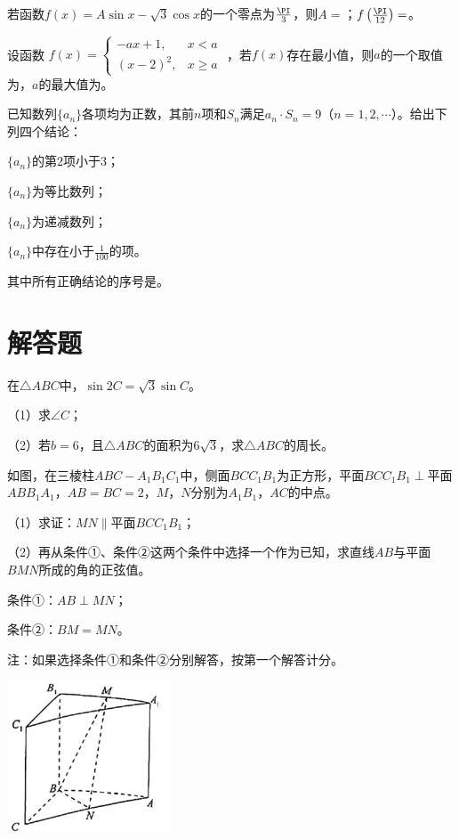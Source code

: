\documentclass[fontset=founder]{ucedubook}
\let\pi=\PI
\begin{document}
\begin{ti}[.2]
  若函数$f(x)=A\sin x-\sqrt{3}\cos x$的一个零点为$\frac{\pi}{3}$，则$A=$\kong{}；$f\left(\frac{\pi}{12}\right)=$\kong{}。
\end{ti}


\begin{ti}[.2]
  设函数 $f(x)=\begin{cases}
    -ax+1, & x<a \\
    (x-2)^2, & x\ge a
  \end{cases}$ ，若$f(x)$存在最小值，则$a$的一个取值为\kong{}，$a$的最大值为\kong{}。
\end{ti}


\begin{ti}[.2]
  已知数列$\{a_n\}$各项均为正数，其前$n$项和$S_n$满足$a_n\cdot S_n=9$（$n=1,2,\cdots$）。给出下列四个结论：

  \begin{choices}[0][4]
    \item $\{a_n\}$的第$2$项小于$3$；
    \item $\{a_n\}$为等比数列；
    \item $\{a_n\}$为递减数列；
    \item $\{a_n\}$中存在小于$\frac{1}{100}$的项。
  \end{choices}
  
  其中所有正确结论的序号是\kong{}。
\end{ti}


\newpageb
\section{解答题}

\begin{ti}
  在$\triangle ABC$中，$\sin 2C=\sqrt{3}\sin C$。

  （1）求$\angle C$；
  
  （2）若$b=6$，且$\triangle ABC$的面积为$6\sqrt{3}$，求$\triangle ABC$的周长。
\end{ti}


\begin{ti}
  如图，在三棱柱$ABC-A_1B_1C_1$中，侧面$BC C_1B_1$为正方形，平面$BC C_1B_1\perp$平面$AB B_1A_1$，$AB=BC=2$，$M$，$N$分别为$A_1B_1$，$AC$的中点。

  （1）求证：$MN\parallel $平面$ BC C_1B_1$；
  
  （2）再从条件①、条件②这两个条件中选择一个作为已知，求直线$AB$与平面$BMN$所成的角的正弦值。

  条件①：$AB\perp MN$；
  
  条件②：$BM=MN$。

  注：如果选择条件①和条件②分别解答，按第一个解答计分。

  \hfill\includegraphics{北京-17.png}
\end{ti}
\end{document}
